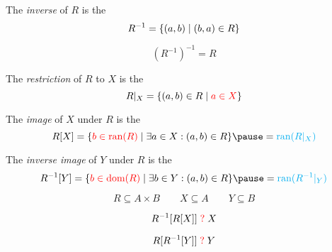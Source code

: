 
\begin{frame}{}
  \begin{center}
  \end{center}
\end{frame}

\begin{frame}{}
  \begin{definition}[Inverse]
    The {\it inverse} of $R$ is the 
    \[
      R^{-1} = \{(a, b) \mid (b, a) \in R\}
    \]
  \end{definition}

  \pause
  \vspace{0.50cm}
  \begin{theorem}
    \[
      (R^{-1})^{-1} = R
    \]
  \end{theorem}
  
  \pause
  \vspace{0.50cm}
  \begin{definition}[Restriction]
    The {\it restriction} of $R$ to $X$ is the 
    \[
      R|_{X} = \{(a, b) \in R \mid \textcolor{red}{a \in X}\}
    \]
  \end{definition}
\end{frame}

\begin{frame}{}
  \begin{definition}[Image]
    The {\it image} of $X$ under $R$ is the 
    \[
      {R[X] = \set{\red{b \in \text{ran}(R)} \mid \exists a \in X: (a, b) \in R} \pause = \cyan{\text{ran}(R|_{X})}}
    \]
  \end{definition}

  \pause
  \vspace{0.50cm}
  \begin{definition}
    The {\it inverse image} of $Y$ under $R$ is the 
    \[
      {R^{-1}[Y] = \set{\red{b \in \text{dom}(R)} \mid \exists b \in Y: (a, b) \in R} \pause = \cyan{\text{ran}(R^{-1}|_{Y})}}
    \]
  \end{definition}
\end{frame}

\begin{frame}{}
  \[
    R \subseteq A \times B \qquad X \subseteq A \qquad Y \subseteq B
  \]

  \pause
  \[
    R^{-1}[R[X]] \;\textcolor{red}{?}\; X
  \]

  \[
    R[R^{-1}[Y]] \;\textcolor{red}{?}\; Y
  \]

  \pause
  \vspace{0.60cm}
\end{frame}

